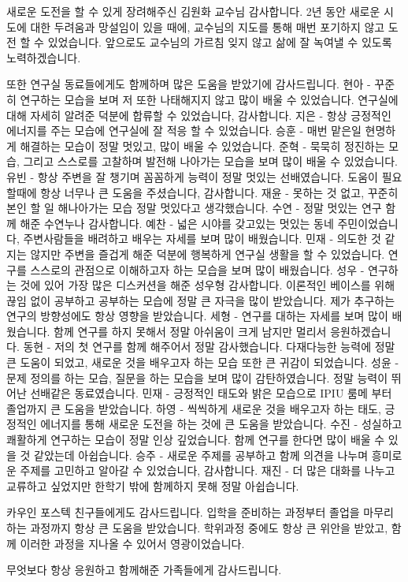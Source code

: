 새로운 도전을 할 수 있게 장려해주신 김원화 교수님 감사합니다. 
2년 동안 새로운 시도에 대한 두려움과 망설임이 있을 때에, 교수님의 지도를 통해 매번 포기하지 않고 도전 할 수 있었습니다.
앞으로도 교수님의 가르침 잊지 않고 삶에 잘 녹여낼 수 있도록 노력하겠습니다.

또한 연구실 동료들에게도 함께하며 많은 도움을 받았기에 감사드립니다.
현아 - 꾸준히 연구하는 모습을 보며 저 또한 나태해지지 않고 많이 배울 수 있었습니다. 연구실에 대해 자세히 알려준 덕분에 합류할 수 있었습니다, 감사합니다.
지은 - 항상 긍정적인 에너지를 주는 모습에 연구실에 잘 적응 할 수 있었습니다.
승훈 - 매번 맡은일 현명하게 해결하는 모습이 정말 멋있고, 많이 배울 수 있었습니다. 
준혁 - 묵묵히 정진하는 모습, 그리고 스스로를 고찰하며 발전해 나아가는 모습을 보며 많이 배울 수 있었습니다.
유빈 - 항상 주변을 잘 챙기며 꼼꼼하게 능력이 정말 멋있는 선배였습니다. 도움이 필요할때에 항상 너무나 큰 도움을 주셨습니다, 감사합니다.
재윤 - 못하는 것 없고, 꾸준히 본인 할 일 해나아가는 모습 정말 멋있다고 생각했습니다.
수연 - 정말 멋있는 연구 함께 해준 수연누나 감사합니다.
예찬 - 넓은 시야를 갖고있는 멋있는 동네 주민이었습니다, 주변사람들을 배려하고 배우는 자세를 보며 많이 배웠습니다.
민재 - 의도한 것 같지는 않지만 주변을 즐겁게 해준 덕분에 행복하게 연구실 생활을 할 수 있었습니다. 연구를 스스로의 관점으로 이해하고자 하는 모습을 보며 많이 배웠습니다.
성우 - 연구하는 것에 있어 가장 많은 디스커션을 해준 성우형 감사합니다. 이론적인 베이스를 위해 끊임 없이 공부하고 공부하는 모습에 정말 큰 자극을 많이 받았습니다. 제가 추구하는 연구의 방향성에도 항상 영향을 받았습니다.
세형 - 연구를 대하는 자세를 보며 많이 배웠습니다. 함께 연구를 하지 못해서 정말 아쉬움이 크게 남지만 멀리서 응원하겠습니다.
동현 - 저의 첫 연구를 함께 해주어서 정말 감사했습니다. 다재다능한 능력에 정말 큰 도움이 되었고, 새로운 것을 배우고자 하는 모습 또한 큰 귀감이 되었습니다.
성윤 - 문제 정의를 하는 모습, 질문을 하는 모습을 보며 많이 감탄하였습니다. 정말 능력이 뛰어난 선배같은 동료였습니다. 
민재 - 긍정적인 태도와 밝은 모습으로 IPIU 룸메 부터 졸업까지 큰 도움을 받았습니다.
하영 - 씩씩하게 새로운 것을 배우고자 하는 태도, 긍정적인 에너지를 통해 새로운 도전을 하는 것에 큰 도움을 받았습니다.
수진 - 성실하고 쾌활하게 연구하는 모습이 정말 인상 깊었습니다. 함께 연구를 한다면 많이 배울 수 있을 것 같았는데 아쉽습니다.
승주 - 새로운 주제를 공부하고 함께 의견을 나누며 흥미로운 주제를 고민하고 알아갈 수 있었습니다, 감사합니다.
재진 - 더 많은 대화를 나누고 교류하고 싶었지만 한학기 밖에 함께하지 못해 정말 아쉽습니다.

카우인 포스텍 친구들에게도 감사드립니다. 입학을 준비하는 과정부터 졸업을 마무리하는 과정까지 항상 큰 도움을 받았습니다.
학위과정 중에도 항상 큰 위안을 받았고, 함께 이러한 과정을 지나올 수 있어서 영광이었습니다.

무엇보다 항상 응원하고 함께해준 가족들에게 감사드립니다.